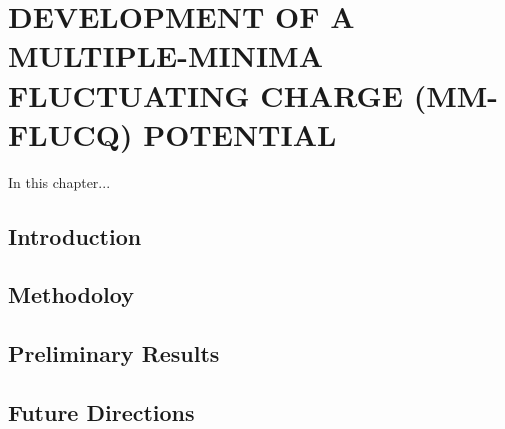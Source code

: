 
\chapter{DEVELOPMENT OF A MULTIPLE-MINIMA FLUCTUATING CHARGE (MM-FLUCQ) POTENTIAL}
\label{chap:mmFlucQ}


In this chapter...


\section{Introduction}


\section{Methodoloy}

\section{Preliminary Results}

\section{Future Directions}
